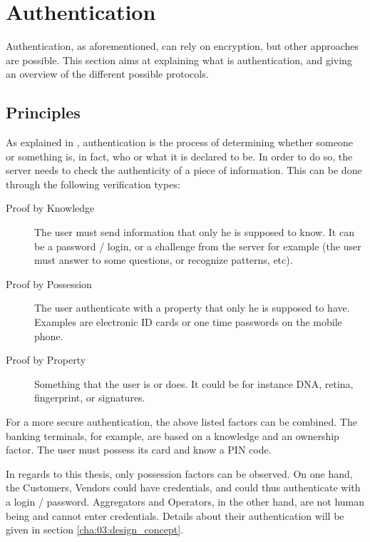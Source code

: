 \section{Authentication}
\label{02_authentication}

Authentication, as aforementioned, can rely on encryption, but other approaches are possible. This section aims at explaining what is authentication, and giving an overview of the different possible protocols. 

\subsection{Principles}
As explained in \cite{patel2008information}, authentication is the process of determining whether someone or something is, in fact, who or what it is declared to be. In order to do so, the server needs to check the authenticity of a piece of information. This can be done through the following verification types:

\begin{description}
	\item[Proof by Knowledge] The user must send information that only he is supposed to know. It can be a password / login, or a challenge from the server for example (the user must answer to some questions, or recognize patterns, etc).
	\item[Proof by Possession] The user authenticate with a property that only he is supposed to have. Examples are electronic ID cards or one time passwords on the mobile phone.
	\item[Proof by Property] Something that the user is or does. It could be for instance DNA, retina, fingerprint, or signatures. 
\end{description}

For a more secure authentication, the above listed factors can be combined. The banking terminals, for example, are based on a knowledge and an ownership factor. The user must possess its card and know a PIN code.

In regards to this thesis, only possession factors can be observed. On one hand, the Customers, Vendors could have credentials, and could thus authenticate with a login / password. Aggregators and Operators, in the other hand, are not human being and cannot enter credentials. Details about their authentication will be given in section \ref{cha:03:design_concept}.


